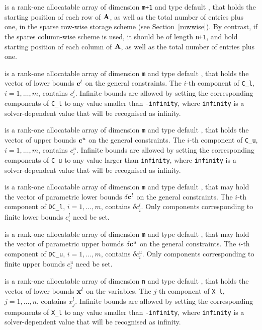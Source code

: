 \documentclass{galahad}
\begin{document}
\begin{description}
\begin{description}
 is a rank-one allocatable array of dimension {\tt m+1} and type 
default \integer, that holds the 
starting position of each row of ${\mathbf{A}}$, as well
as the total number of entries plus one, in the sparse row-wise storage
scheme (see Section~\ref{rowwise}). By contrast, if the spares column-wise 
scheme is used, it should be of length {\tt n+1}, and hold
starting position of each column of ${\mathbf{A}}$, as well
as the total number of entries plus one.
\end{description}

 is a rank-one allocatable array of dimension {\tt m} and type 
default \realdp, that holds the vector of lower bounds ${\mathbf{c}}^{l}$ 
on the general constraints. The $i$-th component of 
{\tt C\_l}, $i = 1, \ldots , m$, contains $c_{i}^{l}$.
Infinite bounds are allowed by setting the corresponding 
components of {\tt C\_l} to any value smaller than {\tt -infinity}, 
where {\tt infinity} is a  solver-dependent value that will be recognised as
infinity.

 is a rank-one allocatable array of dimension {\tt m} and type 
default \realdp, that holds the vector of upper bounds ${\mathbf{c}}^{u}$ 
on the general constraints. The $i$-th component of 
{\tt C\_u}, $i = 1,  \ldots ,  m$, contains $c_{i}^{u}$.
Infinite bounds are allowed by setting the corresponding 
components of {\tt C\_u} to any value larger than {\tt infinity}, 
where {\tt infinity} is a  solver-dependent value that will be recognised as
infinity.

 is a rank-one allocatable array of dimension {\tt m} and type 
default \realdp, that may hold the vector of parametric lower bounds 
$\delta {\mathbf{c}}^{l}$ on the general constraints. The $i$-th component of 
{\tt DC\_l}, $i = 1, \ldots , m$, contains $\delta c_{i}^{l}$.
Only components corresponding to finite lower bounds $c_{i}^{l}$
need be set.

 is a rank-one allocatable array of dimension {\tt m} and type 
default \realdp, that may hold the vector of parametric upper bounds 
$\delta {\mathbf{c}}^{u}$  on the general constraints. The $i$-th component of 
{\tt DC\_u}, $i = 1,  \ldots ,  m$, contains $\delta c_{i}^{u}$.
Only components corresponding to finite upper bounds $c_{i}^{u}$
need be set.

 is a rank-one allocatable array of dimension {\tt n} and type 
default \realdp, that holds
the vector of lower bounds ${\mathbf{x}}^{l}$ on the variables.
The $j$-th component of {\tt X\_l}, $j = 1, \ldots , n$, 
contains $x_{j}^{l}$.
Infinite bounds are allowed by setting the corresponding 
components of {\tt X\_l} to any value smaller than {\tt -infinity}, 
where {\tt infinity} is a  solver-dependent value that will be recognised as
infinity.


\end{description}
\end{document}
